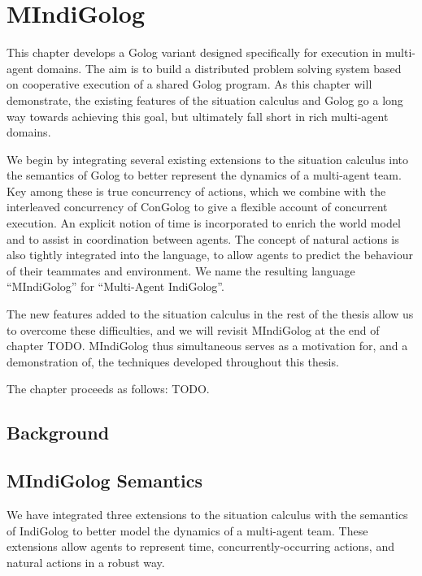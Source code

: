 
\chapter{MIndiGolog}

\label{ch:mindigolog}

This chapter develops a Golog variant designed specifically for execution
in multi-agent domains. The aim is to build a distributed problem
solving system based on cooperative execution of a shared Golog program.
As this chapter will demonstrate, the existing features of the situation
calculus and Golog go a long way towards achieving this goal, but
ultimately fall short in rich multi-agent domains.

We begin by integrating several existing extensions to the situation
calculus into the semantics of Golog to better represent the dynamics
of a multi-agent team. Key among these is true concurrency of actions,
which we combine with the interleaved concurrency of ConGolog to give
a flexible account of concurrent execution. An explicit notion of
time is incorporated to enrich the world model and to assist in coordination
between agents. The concept of natural actions is also tightly integrated
into the language, to allow agents to predict the behaviour of their
teammates and environment. We name the resulting language {}``MIndiGolog''
for {}``Multi-Agent IndiGolog''.

The new features added to the situation calculus in the rest of the
thesis allow us to overcome these difficulties, and we will revisit
MIndiGolog at the end of chapter TODO. MIndiGolog thus simultaneous
serves as a motivation for, and a demonstration of, the techniques
developed throughout this thesis.

The chapter proceeds as follows: TODO.


\section{Background}


\section{MIndiGolog Semantics\label{sec:MIndiGolog}}

We have integrated three extensions to the situation calculus with
the semantics of IndiGolog to better model the dynamics of a multi-agent
team. These extensions allow agents to represent time, concurrently-occurring
actions, and natural actions in a robust way.



